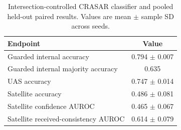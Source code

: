 \begin{table}[t]
\centering
\caption{Intersection-controlled CRASAR classifier and pooled held-out paired results. Values are mean $\pm$ sample SD across seeds.}
\label{tab:crasar-summary}
\begin{tabular}{lc}
\toprule
Endpoint & Value \\
\midrule
Guarded internal accuracy & 0.794 $\pm$ 0.007 \\
Guarded internal majority accuracy & 0.635 \\
UAS accuracy & 0.747 $\pm$ 0.014 \\
Satellite accuracy & 0.486 $\pm$ 0.081 \\
Satellite confidence AUROC & 0.465 $\pm$ 0.067 \\
Satellite received-consistency AUROC & 0.614 $\pm$ 0.079 \\
\bottomrule
\end{tabular}
\end{table}
